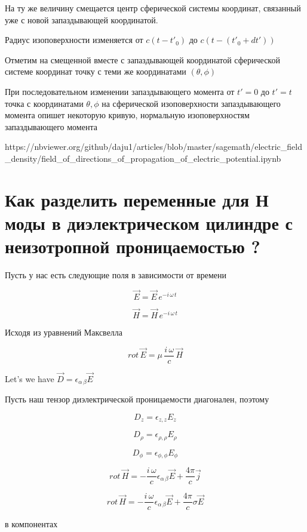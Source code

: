 \documentclass{article}
\begin{document}
На ту же величину смещается центр сферической системы координат, связанный уже с новой запаздывающей координатой.

Радиус изоповерхности изменяется от $c(t-t'_{0})$ до $c(t-(t'_{0} + d t'))$

Отметим на смещенной вместе с запаздывающей координатой сферической системе координат точку с теми же координатами $(\theta, \phi)$

При последовательном изменении запаздывающего момента от $t'=0$ до $t'=t$ точка с координатами $\theta, \phi$ на сферической изоповерхности запаздывающего момента опишет некоторую кривую, нормальную изоповерхностям запаздывающего момента

https://nbviewer.org/github/daju1/articles/blob/master/sagemath/electric\_field\_density/field\_of\_directions\_of\_propagation\_of\_electric\_potential.ipynb


\section{Как разделить переменные для Н моды в диэлектрическом цилиндре с неизотропной проницаемостью ?}


Пусть у нас есть следующие поля в зависимости от времени

$$\vec{E} = \vec{E}\,e^{-i\,\omega\,t}$$

$$\vec{H} = \vec{H}\,e^{-i\,\omega\,t}$$

Исходя из уравнений Максвелла

$$rot\,\vec{E} = \mu\,\frac{i\,\omega}{c}\,\vec{H}$$

Let's we have $\vec D = \epsilon_{\alpha\,\beta} \vec{E}$

Пусть наш тензор диэлектрической проницаемости диагонален, поэтому

$$D_{z} = \epsilon_{z,z} {E}_z$$

$$D_{\rho} = \epsilon_{\rho, \rho} {E}_\rho$$

$$D_{\phi} = \epsilon_{\phi, \phi} {E}_\phi$$

$$rot\,\vec{H} = - \frac{i\,\omega}{c} \epsilon_{\alpha\,\beta} \vec{E} + \frac{4\pi}{c}\vec{j}$$

$$rot\,\vec{H} = - \frac{i\,\omega}{c} \epsilon_{\alpha\,\beta} \vec{E} + \frac{4\pi}{c} \sigma \vec{E}$$

в компонентах
\end{document}
